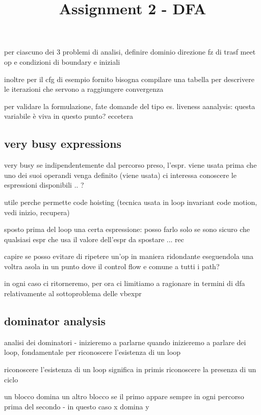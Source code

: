 

\title{Assignment 2 - DFA}


\maketitle

per ciascuno dei 3 problemi di analisi, definire dominio direzione fz di trasf meet op e condizioni di boundary e iniziali

inoltre per il cfg di esempio fornito bisogna compilare una tabella per descrivere le iterazioni che servono a raggiungere convergenza

per validare la formulazione, fate domande del tipo es. liveness aanalysis: questa variabile \`e viva in questo punto? eccetera

\subsection{very busy expressions}

very busy se indipendentemente dal percorso preso, l'espr. viene usata prima che uno dei suoi operandi venga definito (viene usata)
ci interessa conoscere le espressioni disponibili .. ?

utile perche permette code hoisting (tecnica usata in loop invariant code motion, vedi inizio, recupera)

sposto prima del loop una certa espressione: posso farlo solo se sono sicuro che qualsiasi espr che usa il valore dell'espr da spostare ... rec

capire se posso evitare di ripetere un'op in maniera ridondante eseguendola una voltra asola in un punto dove il control flow e comune a tutti i path?

in ogni caso ci ritorneremo, per ora ci limitiamo a ragionare in termini di dfa relativamente al sottoproblema delle vbexpr

\subsection{dominator analysis}

analisi dei dominatori - inizieremo a parlarne quando inizieremo a parlare dei loop, fondamentale per riconoscere l'esistenza di un loop

riconoscere l'esistenza di un loop significa in primis riconoscere la presenza di un ciclo

un blocco domina un altro blocco se il primo appare sempre in ogni percorso prima del secondo - in questo caso x domina y

